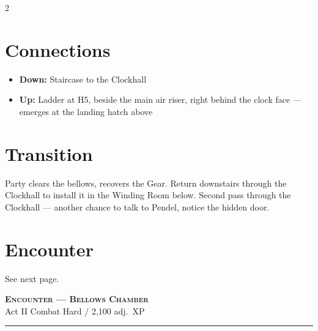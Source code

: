 \documentclass[10pt,letterpaper]{article}
\newcommand{\sceneheader}[4]{%
  \fancyhead[L]{\small\textcolor{accent}{\scshape #1}}%
  \fancyhead[R]{\small\textcolor{accent}{#2 \quad \textbullet \quad #3}}%
  \begin{center}
  {\LARGE\bfseries\scshape\textcolor{accent}{#1}}\\[2pt]
  {\small #2 \quad \textbullet \quad #3 \quad \textbullet \quad #4}\\[2pt]
  \textcolor{rulecol}{\rule{0.5\textwidth}{0.8pt}}
  \end{center}
  \vspace{-4pt}
}
\begin{document}
\begin{multicols}{2}
\columnbreak

\section*{Connections}
\begin{itemize}
\item \textbf{Down:} Staircase to the Clockhall
\item \textbf{Up:} Ladder at H5, beside the main air riser, right behind the clock face --- emerges at the landing hatch above
\end{itemize}

\section*{Transition}
Party clears the bellows, recovers the Gear. Return downstairs through the Clockhall to install it in the Winding Room below. Second pass through the Clockhall --- another chance to talk to Pendel, notice the hidden door.

\section*{Encounter}
See next page.

\end{multicols}

\newpage


\label{sec:enc-bellows}\sceneheader{Encounter --- Bellows Chamber}{Act II}{Combat}{Hard / {\texttildelow}2,100 adj.\ XP}
\end{document}
